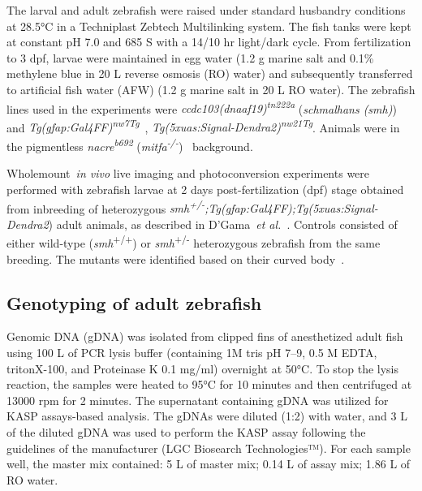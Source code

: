 \documentclass[fleqn]{wlscirep}
\begin{document}
The larval and adult zebrafish were raised under standard husbandry
conditions at 28.5°C in a Techniplast Zebtech Multilinking system.
The fish tanks were kept at constant pH 7.0 and 685 \textmu S with a
14/10 hr light/dark cycle.
From fertilization to 3 dpf, larvae were maintained in egg
water (1.2 g marine salt and 0.1\% methylene blue in 20 L reverse osmosis (RO) water)
and subsequently transferred to artificial fish water (AFW)
(1.2 g marine salt in 20 L RO water). The zebrafish lines used in the experiments were
\emph{ccdc103(dnaaf19)\textsuperscript{tn222a}}
(\emph{schmalhans (smh)})~\cite{Jau-NianChen1997Left-rightZebrafish}
and \emph{Tg(gfap:Gal4FF)\textsuperscript{nw7Tg}}~\cite{DiazVerdugo2019Glia-neuronSeizures},
\emph{Tg(5xuas:Signal-Dendra2)\textsuperscript{nw21Tg}}.
Animals were in the pigmentless \emph{nacre\textsuperscript{b692}}
(\emph{mitfa\textsuperscript{-/-}})~\cite{JamesA.Lister1999NacreFate} background.

Wholemount~\emph{in vivo} live imaging and photoconversion
experiments were performed with zebrafish larvae at 2 days post-fertilization (dpf) stage obtained from inbreeding of heterozygous
\emph{smh\textsuperscript{+/-};Tg(gfap:Gal4FF);Tg(5xuas:Signal-Dendra2})
adult animals, as described in D'Gama~\emph{et al.}~\cite{DGama2024Cilia-mediatedBrain}.
Controls consisted of either wild-type (\emph{smh}\textsuperscript{+/+})
or \emph{smh}\textsuperscript{+/-} heterozygous zebrafish from the same breeding.
The mutants were identified based on their curved body~\cite{Jau-NianChen1997Left-rightZebrafish}.

\subsection*{Genotyping of adult zebrafish}
Genomic DNA (gDNA) was isolated from clipped fins of anesthetized adult
fish using 100 \textmu L of PCR lysis buffer (containing 1M tris pH 7--9, 0.5 M EDTA,
tritonX-100, and Proteinase K 0.1 mg/ml) overnight at 50°C.
To stop the lysis reaction, the samples were heated to 95°C for 10 minutes
and then centrifuged at 13000 rpm for 2 minutes.
The supernatant containing gDNA was utilized for KASP assays-based analysis.
The gDNAs were diluted (1:2) with water, and 3 \textmu L of the diluted gDNA was
used to perform the KASP assay following the guidelines of the manufacturer (LGC Biosearch Technologies™).
For each sample well, the master mix contained: 5 \textmu L of master mix; 0.14
\textmu L of assay mix; 1.86 \textmu L of RO water.
\end{document}
